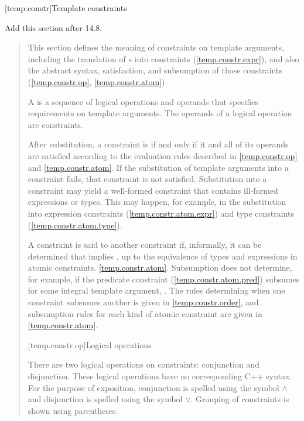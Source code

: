 
[temp.constr]{Template constraints}

Add this section after 14.8.

\begin{quote}

\pnum
\enternote
This section defines the meaning of constraints on template arguments, including
the translation of s
into constraints (\ref{temp.constr.expr}),
and also the abstract syntax, satisfaction, and subsumption of those 
constraints (\ref{temp.constr.op}, \ref{temp.constr.atom}).
\exitnote

\pnum
A  is a sequence of logical operations and 
operands that specifies requirements on template arguments.
\enternote The operands of a logical operation are constraints. \exitnote






\pnum
After substitution, a constraint is  if and only if 
it and all of its operands are satisfied according to the evaluation 
rules described in \ref{temp.constr.op} and \ref{temp.constr.atom}.
% 
If the substitution of template arguments into a constraint fails, 
that constraint is not satisfied.
% 
\enternote
Substitution into a constraint may yield a well-formed constraint that
contains ill-formed expressions or types. This may happen, for
example, in the substitution into expression constraints
(\ref{temp.constr.atom.expr}) and type constraints
(\ref{temp.constr.atom.type}).
\exitnote

\pnum
A constraint  is said to  another constraint  
if, informally, it can be determined that  implies , up to 
the equivalence of types and expressions in atomic constraints.
\ref{temp.constr.atom}. 
% 
\enternote
Subsumption does not determine, for example, if the predicate 
constraint (\ref{temp.constr.atom.pred}) 
 subsumes  for 
some integral template argument, . 
\exitnote
% 
The rules determining when one constraint subsumes another is given
in \ref{temp.constr.order}, and subsumption
rules for each kind of atomic constraint are given in
\ref{temp.constr.atom}.


[temp.constr.op]{Logical operations}

\pnum
There are two logical operations on constraints: conjunction
and disjunction.
% 
\enternote 
These logical operations have no corresponding C++ syntax.
For the purpose of exposition, conjunction is spelled
using the symbol $\land$ and disjunction is spelled using the 
symbol $\lor$. Grouping of constraints is shown using parentheses.
\exitnote


\end{quote}
